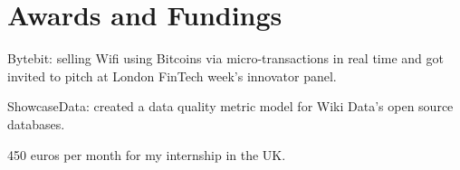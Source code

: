 \documentclass[]{deedy-resume-openfont}
\begin{document}
\begin{minipage}[t]{0.66\textwidth}
%
%
%


\section{Awards and Fundings} 
\begin{tightemize}
\item Bytebit: selling Wifi using Bitcoins via micro-transactions in real time 
 and got invited to pitch at London FinTech week's innovator panel.
\end{tightemize}

\sectionsep

\begin{verytightemize}
\item ShowcaseData: created a data quality metric model for Wiki Data's open source databases.
\end{verytightemize}

\sectionsep
{}
\begin{verytightemize}
\item 450 euros per month for my internship in the UK.
\end{verytightemize}


\end{minipage}
\end{document}
